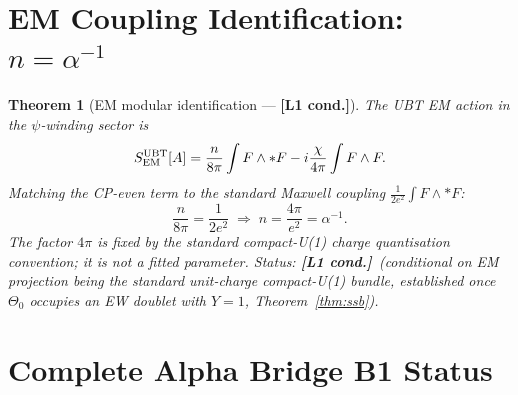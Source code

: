 \documentclass[12pt,a4paper]{article}
\newtheorem{theorem}{Theorem}[section]
\theoremstyle{definition}\newtheorem{definition}[theorem]{Definition}
\theoremstyle{remark}\newtheorem{remark}[theorem]{Remark}
\newcommand{\Lc}{\textbf{[L1 cond.]}}
\begin{document}
\section{EM Coupling Identification: $n=\alpha^{-1}$}
\label{sec:em}

\begin{theorem}[EM modular identification --- \Lc]
\label{thm:em}
The UBT EM action in the $\psi$-winding sector is
\[
  S^{\rm UBT}_{\rm EM}[A]
  = \frac{n}{8\pi}\int F\wedge *F - i\frac{\chi}{4\pi}\int F\wedge F.
\]
Matching the CP-even term to the standard Maxwell coupling
$\tfrac{1}{2e^2}\int F\wedge *F$:
\[
  \frac{n}{8\pi} = \frac{1}{2e^2}
  \;\Longrightarrow\;
  n = \frac{4\pi}{e^2} = \alpha^{-1}.
\]
The factor $4\pi$ is fixed by the standard compact-U(1) charge
quantisation convention; it is not a fitted parameter.
Status: \Lc\ (conditional on EM projection being the standard unit-charge
compact-U(1) bundle, established once $\Theta_0$ occupies an EW doublet
with $Y=1$, Theorem~\ref{thm:ssb}).
\end{theorem}

\section{Complete Alpha Bridge B1 Status}
\label{sec:status}
\end{document}
